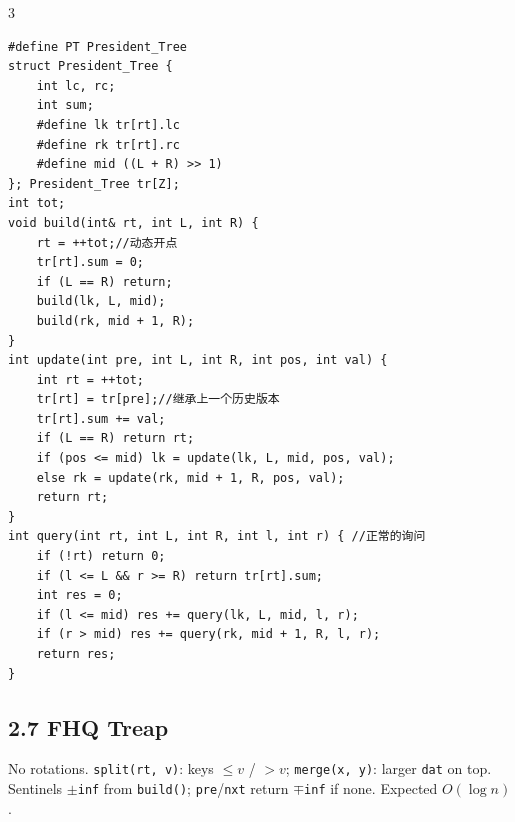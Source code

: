 \documentclass[8pt]{extarticle}
\begin{document}
\begin{multicols*}{3}
\begin{lstlisting}
#define PT President_Tree
struct President_Tree {
    int lc, rc;
    int sum;
    #define lk tr[rt].lc
    #define rk tr[rt].rc
    #define mid ((L + R) >> 1)
}; President_Tree tr[Z];
int tot;
void build(int& rt, int L, int R) {
    rt = ++tot;//动态开点
    tr[rt].sum = 0;
    if (L == R) return;
    build(lk, L, mid);
    build(rk, mid + 1, R);
}
int update(int pre, int L, int R, int pos, int val) {
    int rt = ++tot;
    tr[rt] = tr[pre];//继承上一个历史版本
    tr[rt].sum += val;
    if (L == R) return rt;
    if (pos <= mid) lk = update(lk, L, mid, pos, val);
    else rk = update(rk, mid + 1, R, pos, val);
    return rt;
}
int query(int rt, int L, int R, int l, int r) { //正常的询问
    if (!rt) return 0;
    if (l <= L && r >= R) return tr[rt].sum;
    int res = 0;
    if (l <= mid) res += query(lk, L, mid, l, r);
    if (r > mid) res += query(rk, mid + 1, R, l, r);
    return res;
}
\end{lstlisting}

\subsection*{2.7 FHQ Treap}

No rotations. \texttt{split(rt, v)}: keys $\le v$ / $> v$; \texttt{merge(x, y)}: larger \texttt{dat} on top. Sentinels $\pm$\texttt{inf} from \texttt{build()}; \texttt{pre}/\texttt{nxt} return $\mp$\texttt{inf} if none. Expected $O(\log n)$.



\end{multicols*}
\end{document}
